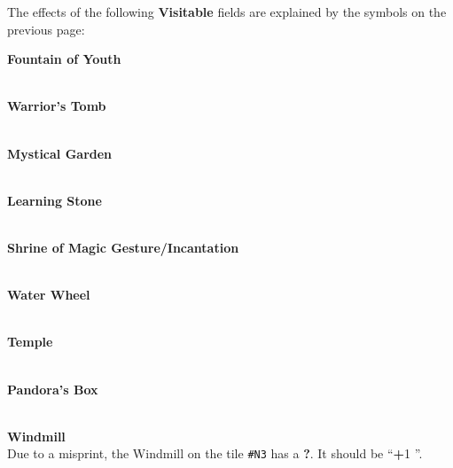 \pagebreak

The effects of the following \textbf{Visitable} fields are explained by the symbols on the previous page:

\begin{multicols*}{2}
{\centering

  \phantom{j}\textbf{Fountain of Youth}\\
  \\

  \bigskip

  \phantom{j}\textbf{Warrior's Tomb}\\
  \\

  \bigskip

  \textbf{Mystical Garden}\\
  \\

  \bigskip

  \phantom{j}\textbf{Learning Stone}\\
  \\

  \bigskip

  \phantom{j}\textbf{Shrine of Magic Gesture/Incantation}\\
  \\

  \vspace*{\fill}
  \filbreak

  \phantom{j}\textbf{Water Wheel}\\
  \\

  \bigskip

  \phantom{j}\textbf{Temple}\\
  \\

  \bigskip

  \phantom{j}\textbf{Pandora's Box}\\
  \\

  \bigskip

  \phantom{j}\textbf{Windmill}\\
  {\small Due to a misprint, the Windmill on the tile \texttt{\#N3} has a \textbf{?}. It should be ``\textbf{+}1 ''.}
}


\end{multicols*}
